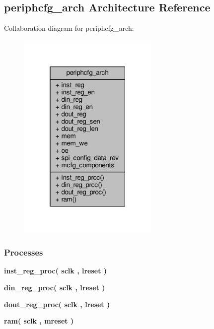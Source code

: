 \subsection{periphcfg\+\_\+arch Architecture Reference}
\label{classperiphcfg_1_1periphcfg__arch}


Collaboration diagram for periphcfg\+\_\+arch\+:\nopagebreak
\begin{figure}[H]
\begin{center}
\leavevmode
\includegraphics[width=193pt]{d1/db6/classperiphcfg_1_1periphcfg__arch__coll__graph}
\end{center}
\end{figure}
\subsubsection*{Processes}
 \begin{DoxyCompactItemize}
\item 
{\bf inst\+\_\+reg\+\_\+proc}{\bfseries  ( {\bfseries {\bfseries {\bf sclk}} \textcolor{vhdlchar}{ }} , {\bfseries {\bfseries {\bf lreset}} \textcolor{vhdlchar}{ }} )}
\item 
{\bf din\+\_\+reg\+\_\+proc}{\bfseries  ( {\bfseries {\bfseries {\bf sclk}} \textcolor{vhdlchar}{ }} , {\bfseries {\bfseries {\bf lreset}} \textcolor{vhdlchar}{ }} )}
\item 
{\bf dout\+\_\+reg\+\_\+proc}{\bfseries  ( {\bfseries {\bfseries {\bf sclk}} \textcolor{vhdlchar}{ }} , {\bfseries {\bfseries {\bf lreset}} \textcolor{vhdlchar}{ }} )}
\item 
{\bf ram}{\bfseries  ( {\bfseries {\bfseries {\bf sclk}} \textcolor{vhdlchar}{ }} , {\bfseries {\bfseries {\bf mreset}} \textcolor{vhdlchar}{ }} )}
\end{DoxyCompactItemize}
